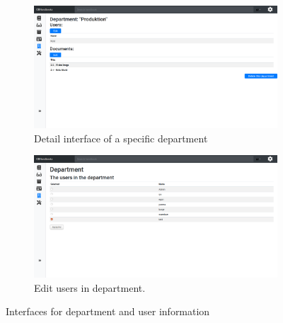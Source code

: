\begin{figure}[H]\ContinuedFloat 
	\centering
	\begin{subfigure}[b]{0.48\textwidth}
		\includegraphics[width=\textwidth]{billeder/iteration3Prototyper/Dep2.png}
		\caption{Detail interface of a specific department}
		\label{fig:5-Dep2}
	\end{subfigure}
	 \quad
 	\begin{subfigure}[b]{0.48\textwidth}
 		\includegraphics[width=\textwidth]{billeder/iteration3Prototyper/Dep3.png}
 		\caption{Edit users in department.}
 		\label{fig:5-Dep3}
 	\end{subfigure}
	\caption{Interfaces for department and user information}\label{fig:5-DepEditU}
\end{figure}
